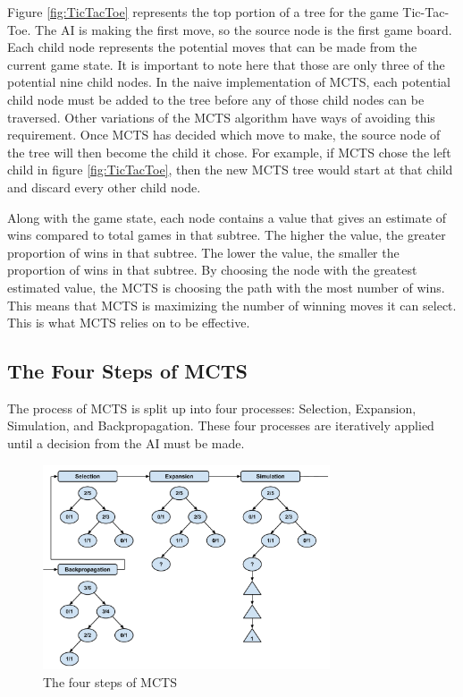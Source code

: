 \documentclass{sig-alternate}
\begin{document}
Figure \ref{fig:TicTacToe} represents the top portion of a tree for the game Tic-Tac-Toe. The AI is making the first move, so the source node is the first game board. Each child node represents the potential moves that can be made from the current game state. It is important to note here that those are only three of the potential nine child nodes. In the naive implementation of MCTS, each potential child node must be added to the tree before any of those child nodes can be traversed. Other variations of the MCTS algorithm have ways of avoiding this requirement\cite{ActionSelection}. Once MCTS has decided which move to make, the source node of the tree will then become the child it chose. For example, if MCTS chose the left child in figure \ref{fig:TicTacToe}, then the new MCTS tree would start at that child and discard every other child node. 

Along with the game state, each node contains a value that gives an estimate of wins compared to total games in that subtree. The higher the value, the greater proportion of wins in that subtree. The lower the value, the smaller the proportion of wins in that subtree. By choosing the node with the greatest estimated value, the MCTS is choosing the path with the most number of wins. This means that MCTS is maximizing the number of winning moves it can select. This is what MCTS relies on to be effective.

\subsection{The Four Steps of MCTS}
The process of MCTS is split up into four processes: Selection, Expansion, Simulation, and Backpropagation. These four processes are iteratively applied until a decision from the AI must be made.

\begin{figure}[h]
	\includegraphics[width=8.5cm]{MCTSFourStepProcess.pdf}
	\centering
	\caption{The four steps of MCTS}
	\label{fig:FourSteps}
\end{figure}
\end{document}
